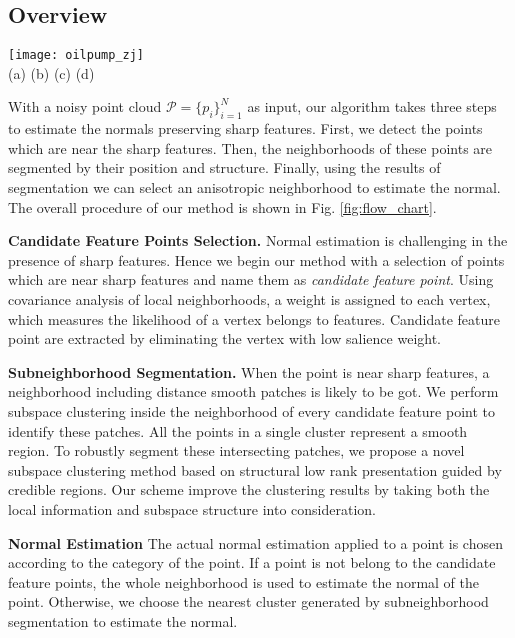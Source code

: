 \subsection{Overview}
{\label{sec:overview}}
\begin{figure*}
  \centering
  \texttt{[image: oilpump\_zj]}\\
  \hspace{3 mm} (a) \hspace{28 mm} (b) \hspace{28 mm} (c)\hspace{28 mm} (d)
  \caption{Method overview.
         (a)Original model of oilpump. (b) Initial detected candidate feature points. (c)The classified subneighborhoods. (d)Estimated normals. }\label{fig:flow_chart}
\end{figure*}
With a noisy point cloud $\mathcal{P}=\{p_{i}\}_{i=1}^{N}$ as input, our algorithm takes three steps to estimate the normals preserving sharp features. First, we detect the points which are near the sharp features. Then, the neighborhoods of these points are segmented by their position and structure. Finally, using the results of segmentation we can select an anisotropic neighborhood to estimate the normal. The overall procedure of our method is shown in Fig. \ref{fig:flow_chart}.

\textbf{Candidate Feature Points Selection.} Normal estimation is challenging in the presence of sharp features. Hence we begin our method with a selection of points which are near sharp features and name them as \emph{candidate feature point}. Using covariance analysis of local neighborhoods, a weight is assigned to each vertex, which measures the likelihood of a vertex belongs to features. Candidate feature point are extracted by eliminating the vertex with low salience weight.

\textbf{Subneighborhood Segmentation.} When the point is near sharp features, a neighborhood including distance smooth patches is likely to be got. We perform subspace clustering inside
the neighborhood of every candidate feature point to identify these patches. All the points in a single cluster represent a smooth region. To robustly segment these intersecting patches, we
propose a novel subspace clustering method based on structural low
rank presentation guided by credible regions. Our scheme improve the clustering results by taking both the local information and subspace structure into consideration.

\textbf{Normal Estimation} The actual normal estimation applied to a point is
chosen according to the category of the point.  If a point is not belong to the candidate feature points, the whole neighborhood is used to estimate the normal of the point. Otherwise, we choose the nearest cluster generated by subneighborhood segmentation to estimate the normal. 